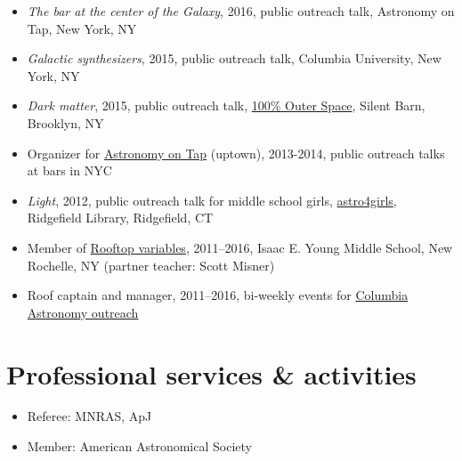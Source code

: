 \documentclass[12pt,letterpaper]{article}
\begin{document}
\begin{itemize}
    \item \emph{The bar at the center of the Galaxy}, 2016, public outreach talk, Astronomy on Tap, New York, NY
    \item \emph{Galactic synthesizers}, 2015, public outreach talk, Columbia University, New York, NY
    \item \emph{Dark matter}, 2015, public outreach talk, \href{http://silentbarn.org/2015/03/100-outer-space-party}{100\% Outer Space}, Silent Barn, Brooklyn, NY
    \item Organizer for \href{http://astronomyontap.org/}{Astronomy on Tap} (uptown), 2013-2014, public outreach talks at bars in NYC
    \item \emph{Light}, 2012, public outreach talk for middle school girls, \href{http://www.newstimes.com/news/article/Astronomer-Shoot-for-the-stars-3380793.php}{astro4girls}, Ridgefield Library, Ridgefield, CT
    \item Member of \href{http://rv.astro.columbia.edu}{Rooftop variables}, 2011--2016, Isaac E. Young Middle School, New Rochelle, NY (partner teacher: Scott Misner)
    \item Roof captain and manager, 2011--2016, bi-weekly events for \href{http://outreach.astro.columbia.edu/}{Columbia Astronomy outreach}
\end{itemize}

\section*{Professional services \& activities}

\begin{itemize}
	\item Referee: MNRAS, ApJ
	\item Member: American Astronomical Society
\end{itemize}
\end{document}
